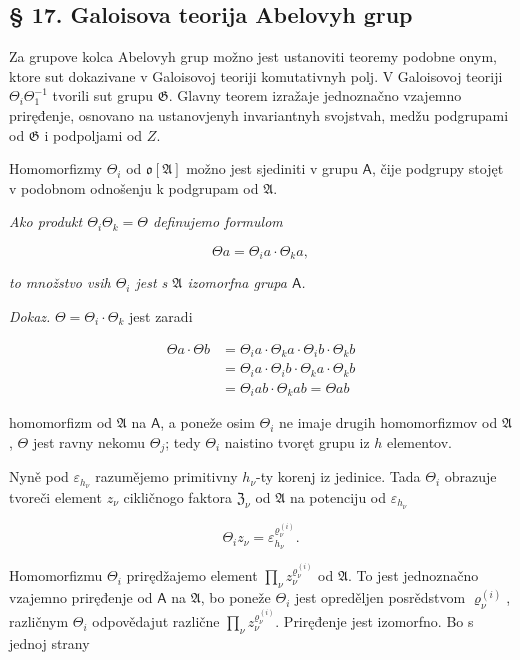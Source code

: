 \documentclass[11pt]{article}
\begin{document}
\subsection*{§ 17. Galoisova teorija Abelovyh grup}\label{die-galoissche-theorie-abelscher-gruppen}

Za grupove kolca Abelovyh grup možno jest ustanoviti teoremy podobne onym, ktore sut dokazivane v Galoisovoj teoriji komutativnyh polj. V Galoisovoj teoriji \(\Theta_i\Theta_1^{-1}\) tvorili sut grupu \(\mathfrak{G}\). Glavny teorem izražaje jednoznačno vzajemno priręđenje, osnovano na ustanovjenyh invariantnyh svojstvah, medžu podgrupami od \(\mathfrak{G}\) i podpoljami od \(Z\).

Homomorfizmy \(\Theta_i\) od \(\mathfrak{o}[\mathfrak{A}]\) možno jest sjediniti v grupu \(\mathsf A\), čije podgrupy stojęt v podobnom odnošenju k podgrupam od \(\mathfrak{A}\).

\emph{Ako produkt \(\Theta_i \Theta_k = \Theta\) definujemo formulom}

\[\Theta a = \Theta_i a \cdot \Theta_k a,\]

\emph{to množstvo vsih \(\Theta_i\) jest s \(\mathfrak A\) izomorfna grupa \(\mathsf A\).}

\emph{Dokaz.} \(\Theta = \Theta_i \cdot \Theta_k\) jest zaradi

\[\begin{aligned}
\Theta a \cdot \Theta b &= \Theta_i a \cdot \Theta_k a \cdot \Theta_i b \cdot \Theta_k b \\
&= \Theta_i a \cdot \Theta_i b \cdot \Theta_k a \cdot \Theta_k b \\
&= \Theta_i a b \cdot \Theta_k a b = \Theta a b
\end{aligned}\]

homomorfizm od \(\mathfrak A\) na \(\mathsf A\), a poneže osim \(\Theta_i\) ne imaje drugih homomorfizmov od \(\mathfrak A\), \(\Theta\) jest ravny nekomu \(\Theta_j\); tedy \(\Theta_i\) naistino tvoręt grupu iz \(h\) elementov.

Nyně pod \(\varepsilon_{h_\nu}\) razumějemo primitivny \(h_\nu\)-ty korenj iz jedinice. Tada \(\Theta_i\) obrazuje tvoreči element \(z_\nu\) cikličnogo faktora \(\mathfrak Z_\nu\) od \(\mathfrak A\) na potenciju od \(\varepsilon_{h_\nu}\)

\[
\Theta_i z_\nu=\varepsilon_{h_\nu}^{\varrho_\nu^{(i)}}.
\]

Homomorfizmu \(\Theta_i\) prirędžajemo element \(\prod_\nu z_\nu^{\varrho_\nu^{(i)}}\) od \(\mathfrak A\). To jest jednoznačno vzajemno priręđenje od \(\mathsf A\) na \(\mathfrak A\), bo poneže \(\Theta_i\) jest opreděljen posrědstvom \(\varrho_\nu^{(i)}\), različnym \(\Theta_i\) odpovědajut različne \(\prod_\nu z_\nu^{\varrho_\nu^{(i)}}\). Priręđenje jest izomorfno. Bo s jednoj strany
\end{document}
